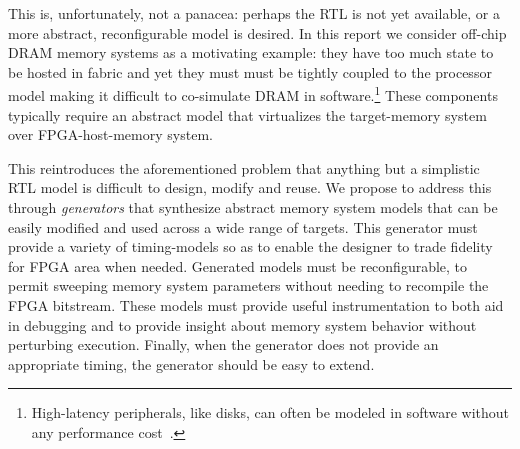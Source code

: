 This is, unfortunately, not a panacea: perhaps the RTL is not yet
available, or a more abstract, reconfigurable model is desired. In this report
we consider off-chip DRAM memory systems as a motivating example: they have too
much state to be hosted in fabric and yet they must must be tightly coupled to
the processor model making it difficult to co-simulate DRAM in
software.\footnote{High-latency peripherals, like disks, can often be modeled
in software without any performance cost~\cite{disksim}.} These components
typically require an abstract model that virtualizes the target-memory system
over FPGA-host-memory system.

This reintroduces the aforementioned problem that anything but a simplistic RTL
model is difficult to design, modify and reuse. We propose to address this
through \emph{generators} that synthesize abstract memory system models that
can be easily modified and used across a wide range of targets.  This generator
must provide a variety of timing-models so as to enable the designer to trade
fidelity for FPGA area when needed. Generated models must be reconfigurable, to
permit sweeping memory system parameters without needing to recompile the FPGA
bitstream. These models must provide useful instrumentation to both aid in
debugging and to provide insight about memory system behavior without
perturbing execution. Finally, when the generator does not provide an
appropriate timing, the generator should be easy to extend.
